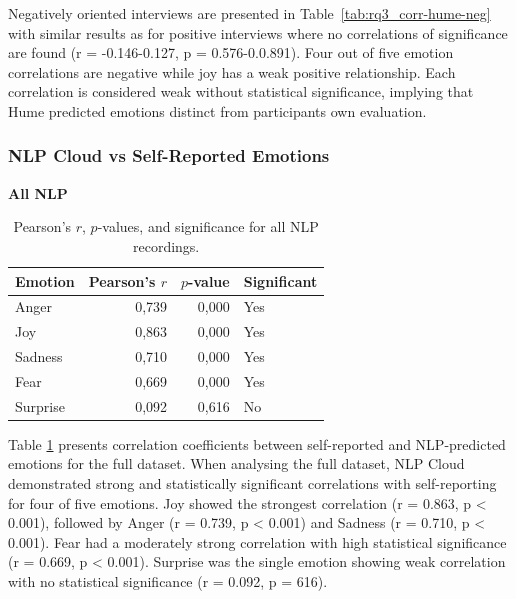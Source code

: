   Negatively oriented interviews are presented in Table~\ref{tab:rq3_corr-hume-neg} with similar results as for positive interviews where no correlations of significance are found (r = -0.146-0.127, p = 0.576-0.0.891). Four out of five emotion correlations are negative while joy has a weak positive relationship. Each correlation is considered weak without statistical significance, implying that Hume predicted emotions distinct from participants own evaluation.  
\subsubsection{NLP Cloud vs Self-Reported Emotions}
\label{sec:nlp-self}
\begin{table}[H]
    \centering
    \caption*{\textbf{All NLP}}
    \begin{tabular}{lrrl}
      \toprule
      \textbf{Emotion} & \textbf{Pearson’s \(r\)} & \textbf{\(p\)-value} & \textbf{Significant} \\
      \midrule
      Anger    & 0,739 & 0,000 & Yes \\
      Joy      & 0,863 & 0,000 & Yes \\
      Sadness  & 0,710 & 0,000 & Yes \\
      Fear     & 0,669 & 0,000 & Yes \\
      Surprise & 0,092 & 0,616 & No  \\
      \bottomrule
    \end{tabular}
    \caption{Pearson’s \(r\), \(p\)-values, and significance for all NLP recordings.}
    \label{tab:rq3_corr-nlp-all}
  \end{table}

  Table \ref{tab:rq3_corr-nlp-all} presents correlation coefficients between self-reported and NLP-predicted emotions for the full dataset.
  When analysing the full dataset, NLP Cloud demonstrated strong and statistically significant correlations with self-reporting for four of five emotions. Joy showed the strongest correlation (r = 0.863, p < 0.001), followed by Anger (r = 0.739, p < 0.001) and Sadness (r = 0.710, p < 0.001). 
Fear had a moderately strong correlation with high statistical significance (r = 0.669, p < 0.001). Surprise was the single emotion showing weak correlation with no statistical significance (r = 0.092, p = 616). 
  
